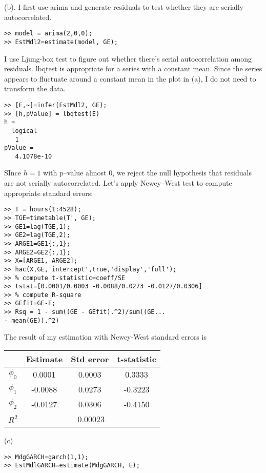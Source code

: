 \documentclass[11pt]{article}
\begin{document}
\bigskip
(b). I first use arima and generate residuals to test whether they are serially autocorrelated.
\begin{lstlisting}
>> model = arima(2,0,0);
>> EstMdl2=estimate(model, GE);
\end{lstlisting}
I use Ljung-box test to figure out whether there's serial autocorrelation among residuals. lbqtest is appropriate for a series with a constant mean. Since the series appears to fluctuate around a constant mean in the plot in (a), I do not need to transform the data.
\begin{lstlisting}
>> [E,~]=infer(EstMdl2, GE);
>> [h,pValue] = lbqtest(E) 
h =
  logical
   1
pValue =
   4.1078e-10
\end{lstlisting}
SInce $h=1$ with p--value almost $0$, we reject the null hypothesis that residuals are not serially autocorrelated. Let's apply Newey--West test to compute appropriate standard errors:
\begin{lstlisting}
>> T = hours(1:4528);
>> TGE=timetable(T', GE);
>> GE1=lag(TGE,1);
>> GE2=lag(TGE,2);
>> ARGE1=GE1{:,1};
>> ARGE2=GE2{:,1};
>> X=[ARGE1, ARGE2];
>> hac(X,GE,'intercept',true,'display','full');
>> % compute t-statistic=coeff/SE
>> tstat=[0.0001/0.0003 -0.0088/0.0273 -0.0127/0.0306]
>> % compute R-square
>> GEfit=GE-E;
>> Rsq = 1 - sum((GE - GEfit).^2)/sum((GE... 
- mean(GE)).^2)
\end{lstlisting}
The result of my estimation with Newey-West standard errors is
\begin{center}
\begin{tabular}{ |c|c|c|c| } 
 \hline
 & Estimate & Std error & t-statistic \\ 
 \hline
 $\phi_0$ & 0.0001 & 0.0003 & 0.3333  \\ 
 $\phi_1$ & -0.0088 & 0.0273 & -0.3223\\ 
 $\phi_2$ & -0.0127 & 0.0306 & -0.4150\\
 \hline
 $R^2$ &\multicolumn{3}{c|}{ 0.00023 }\\
 \hline
\end{tabular}
\end{center}

\bigskip
(c)
\begin{lstlisting}
>> MdgGARCH=garch(1,1);
>> EstMdlGARCH=estimate(MdgGARCH, E);
\end{lstlisting}
\end{document}
